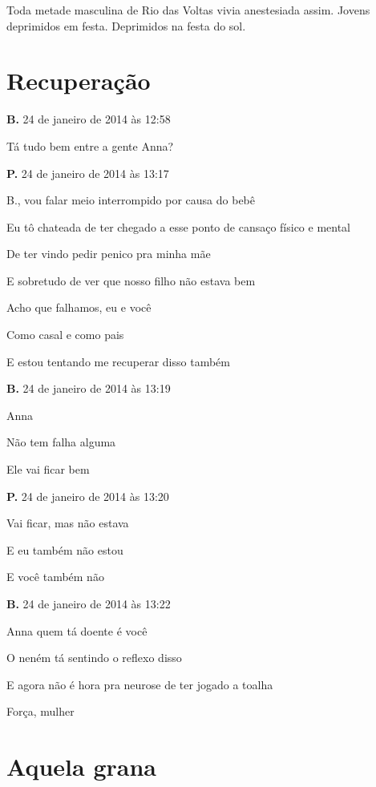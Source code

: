 Toda metade masculina de Rio das Voltas vivia anestesiada assim. Jovens
deprimidos em festa. Deprimidos na festa do sol.

\chapter{Recuperação}


{\parindent0pt\parskip1pt\raggedright
\textbf{B.} 24 de janeiro de 2014 às 12:58

Tá tudo bem entre a gente Anna?

\textbf{P.} 24 de janeiro de 2014 às 13:17

B., vou falar meio interrompido por causa do bebê

Eu tô chateada de ter chegado a esse ponto de cansaço físico e mental

De ter vindo pedir penico pra minha mãe

E sobretudo de ver que nosso filho não estava bem

Acho que falhamos, eu e você

Como casal e como pais

E estou tentando me recuperar disso também

\textbf{B.} 24 de janeiro de 2014 às 13:19

Anna

Não tem falha alguma

Ele vai ficar bem

\textbf{P.} 24 de janeiro de 2014 às 13:20

Vai ficar, mas não estava

E eu também não estou

E você também não

\textbf{B.} 24 de janeiro de 2014 às 13:22

Anna quem tá doente é você

O neném tá sentindo o reflexo disso

E agora não é hora pra neurose de ter jogado a toalha

Força, mulher
}

\chapter{Aquela grana}

